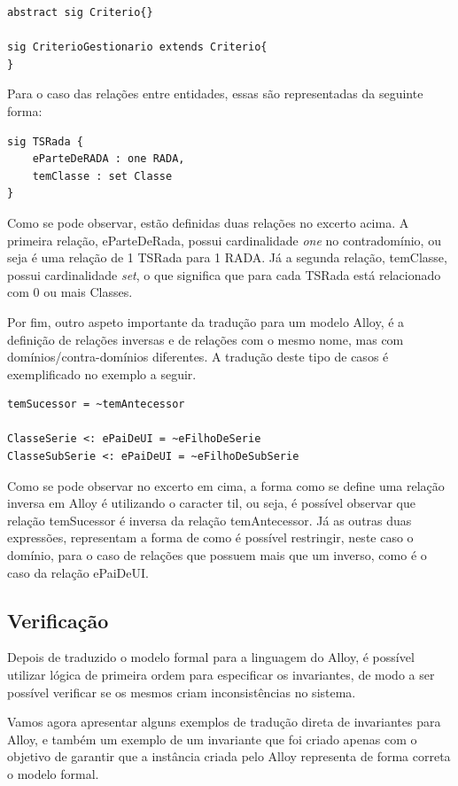 \documentclass{article}
\begin{document}
\begin{lstlisting}[language=alloy, frame=single]
abstract sig Criterio{}

sig CriterioGestionario extends Criterio{
}
\end{lstlisting}

\par Para o caso das relações entre entidades, essas são representadas da seguinte forma:

\begin{lstlisting}[language=alloy, frame=single]
sig TSRada {
	eParteDeRADA : one RADA,
	temClasse : set Classe
}
\end{lstlisting}

\par Como se pode observar, estão definidas duas relações no excerto acima. A primeira relação, eParteDeRada, possui cardinalidade \emph{one} no contradomínio, ou seja é uma relação de 1 TSRada para 1 RADA. Já a segunda relação, temClasse, possui cardinalidade \emph{set}, o que significa que para cada TSRada está relacionado com 0 ou mais Classes. 

\par Por fim, outro aspeto importante da tradução para um modelo Alloy, é a definição de relações inversas e de relações com o mesmo nome, mas com domínios/contra-domínios diferentes. A tradução deste tipo de casos é exemplificado no exemplo a seguir.

\begin{lstlisting}[language=alloy, frame=single]
temSucessor = ~temAntecessor

ClasseSerie <: ePaiDeUI = ~eFilhoDeSerie
ClasseSubSerie <: ePaiDeUI = ~eFilhoDeSubSerie
\end{lstlisting}

\par Como se pode observar no excerto em cima, a forma como se define uma relação inversa em Alloy é utilizando o caracter til, ou seja, é possível observar que relação temSucessor é inversa da relação temAntecessor. Já as outras duas expressões, representam a forma de como é possível restringir, neste caso o domínio, para o caso de relações que possuem mais que um inverso, como é o caso da relação ePaiDeUI.

\subsection{Verificação}
\par Depois de traduzido o modelo formal para a linguagem do Alloy, é possível utilizar lógica de primeira ordem para especificar os invariantes, de modo a ser possível verificar se os mesmos criam inconsistências no sistema.
\par Vamos agora apresentar alguns exemplos de tradução direta de invariantes para Alloy, e também um exemplo de um invariante que foi criado apenas com o objetivo de garantir que a instância criada pelo Alloy representa de forma correta o modelo formal.
\end{document}
